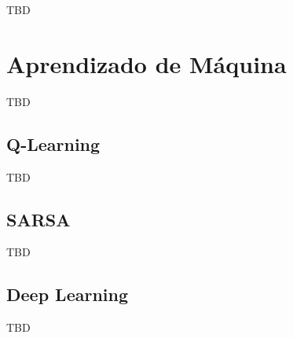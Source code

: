 TBD

\section{Aprendizado de Máquina}

TBD

\subsection{Q-Learning}

TBD

\subsection{SARSA}

TBD

\subsection{Deep Learning}

TBD
